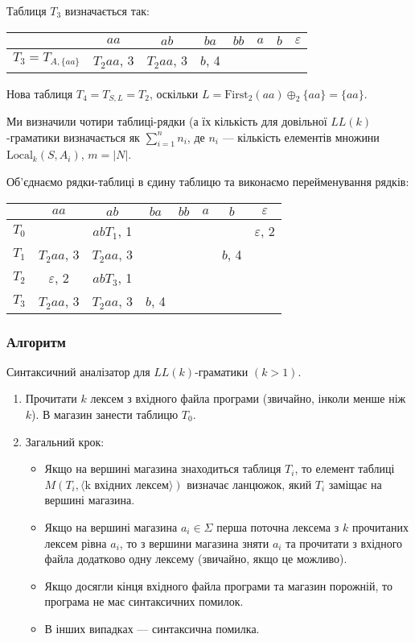 Таблиця $T_3$ визначається так:
\begin{table}[H]
	\centering
	\begin{tabular}{|c|c|c|c|c|c|c|c|}
		\hline
		 & $aa$ & $ab$ & $ba$ & $bb$ & $a$ & $b$ & $\varepsilon$ \\ \hline
		$T_3 = T_{A, \{aa\}}$ & $T_2aa$, 3 & $T_2aa$, 3 & $b$, 4 &  &  &  &  \\ \hline
	\end{tabular}
\end{table}

Нова таблиця $T_4 = T_{S, L} = T_2$, оскільки $L = \text{First}_2(aa) \oplus_2 \{aa\} = \{aa\}$. \medskip

Ми визначили чотири таблиці-рядки (а їх кількість для довільної $LL(k)$-гра\-ма\-ти\-ки визначається як $\sum_{i = 1}^n n_i$, де $n_i$ --- кількість елементів множини $\text{Local}_k(S, A_i)$, $m = \vert N\vert$. \medskip

Об'єднаємо рядки-таблиці в єдину таблицю та виконаємо перейменування рядків:

\begin{table}[H]
	\centering
	\begin{tabular}{|c|c|c|c|c|c|c|c|}
		\hline
		 & $aa$ & $ab$ & $ba$ & $bb$ & $a$ & $b$ & $\varepsilon$ \\ \hline
		$T_0$ &  & $abT_1$, 1 &  &  &  &  & $\varepsilon$, 2 \\ \hline
		$T_1$ & $T_2aa$, 3 & $T_2aa$, 3 &  &  &  & $b$, 4 &  \\ \hline
		$T_2$ & $\varepsilon$, 2 & $abT_3$, 1 &  &  &  &  &  \\ \hline
		$T_3$ & $T_2aa$, 3 & $T_2aa$, 3 & $b$, 4 &  &  &  &  \\ \hline
	\end{tabular}
\end{table}
\subsubsection{Алгоритм}

Синтаксичний аналізатор для $LL(k)$-граматики $(k > 1)$.
\begin{enumerate}
	\item Прочитати $k$ лексем з вхідного файла програми (звичайно, інколи менше ніж $k$). В магазин занести таблицю $T_0$.
	\item Загальний крок:
	\begin{itemize}
		\item Якщо на вершині магазина знаходиться таблиця $T_i$, то елемент таблиці $M(T_i, \langle \text{k вхідних лексем}\rangle)$ визначає ланцюжок, який $T_i$ заміщає на вершині магазина.
		\item Якщо на вершині магазина $a_i \in \Sigma$ перша поточна лексема з $k$ прочитаних лексем рівна $a_i$, то з вершини магазина зняти $a_i$ та прочитати з вхідного файла додатково одну лексему (звичайно, якщо це можливо).
		\item Якщо досягли кінця вхідного файла програми та магазин порожній, то програма не має синтаксичних помилок.
		\item В інших випадках --- синтаксична помилка.
	\end{itemize}
\end{enumerate}

